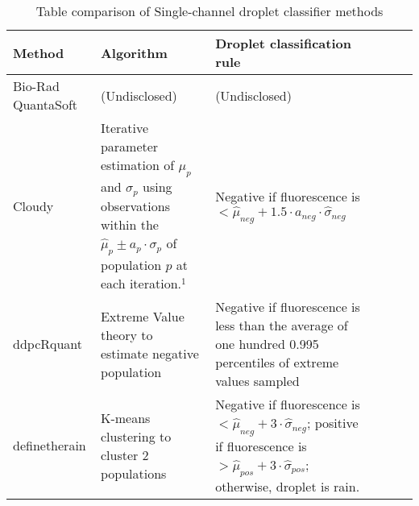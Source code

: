 \begin{table}
    \caption{Table comparison of Single-channel droplet classifier methods}    
    \begin{tabularx}{\textwidth}{p{2.7cm}*{5}{X}}
        \toprule
        \textbf{Method}    & \textbf{Algorithm}                                                                                                                                                                                 & \textbf{Droplet classification rule}                                                                                                                                                            \\ 
        \midrule
        \arrayrulecolor[rgb]{0.753,0.753,0.753}
        Bio-Rad \newline QuantaSoft & (Undisclosed)                                                                                                                                            & (Undisclosed)                                                                                                                                                                                   \\
        \hline
        Cloudy                                                       & Iterative parameter estimation of \(\mu_p\) and \(\sigma_p\) using observations within the \(\hat{\mu}_p \pm a_p \cdot \hat{\sigma}_p\) of population \(p\) at each iteration.\(^1\)   & Negative if   fluorescence is \(< \hat{\mu}_{neg}+1.5 \cdot a_{neg} \cdot \hat{\sigma}_{neg}\)\\
        \hline
        ddpcRquant                                                   & Extreme Value theory to estimate negative population                                                                                                     & Negative if fluorescence is less   than the average of one hundred 0.995 percentiles of extreme values sampled                                                                                  \\
        \hline
        definetherain                                                & K-means clustering to cluster 2 populations                                                                                                              & Negative if fluorescence is \(< \hat{\mu}_{neg}   + 3 \cdot \hat{\sigma}_{neg}\); positive if fluorescence is \(> \hat{\mu}_{pos}   + 3 \cdot \hat{\sigma}_{pos}\); otherwise, droplet is rain. \\

\end{tabularx}
\end{table}
